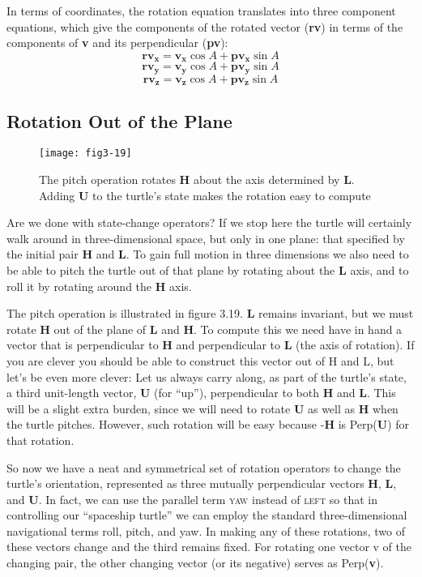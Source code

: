 \documentclass{book}
\begin{document}
In terms of coordinates, the rotation equation translates into three
component equations, which give the components of the rotated vector
(\textbf{rv}) in terms of the components of \textbf{v} and its perpendicular (\textbf{pv}):
$$\mathbf{rv_x} = \mathbf{v_x} \cos A + \mathbf{pv_x} \sin A$$
$$\mathbf{rv_y} = \mathbf{v_y} \cos A + \mathbf{pv_y} \sin A$$
$$\mathbf{rv_z} = \mathbf{v_z} \cos A + \mathbf{pv_z} \sin A$$

\subsection{Rotation Out of the Plane}

\begin{figure}
\begin{center}
\texttt{[image: fig3-19]}
\caption{The pitch operation rotates \textbf{H} about the axis determined by \textbf{L}. Adding \textbf{U} to the turtle's state makes the rotation easy to compute}
\end{center}
\end{figure}

Are we done with state-change operators? If we stop here the turtle will
certainly walk around in three-dimensional space, but only in one plane:
that specified by the initial pair \textbf{H} and \textbf{L}. To gain full motion in three
dimensions we also need to be able to pitch the turtle out of that plane
by rotating about the \textbf{L} axis, and to roll it by rotating around the \textbf{H}
axis.

The pitch operation is illustrated in figure 3.19. \textbf{L} remains invariant,
but we must rotate \textbf{H} out of the plane of \textbf{L} and \textbf{H}. To compute this we
need have in hand a vector that is perpendicular to \textbf{H} and perpendicular
to \textbf{L} (the axis of rotation). If you are clever you should be able to
construct this vector out of H and L, but let's be even more clever: Let
us always carry along, as part of the turtle's state, a third unit-length
vector, \textbf{U} (for ``up''), perpendicular to both \textbf{H} and \textbf{L}. This will be a
slight extra burden, since we will need to rotate \textbf{U} as well as \textbf{H} when
the turtle pitches. However, such rotation will be easy because -\textbf{H} is
Perp(\textbf{U}) for that rotation.

So now we have a neat and symmetrical set of rotation operators to
change the turtle's orientation, represented as three mutually perpendicular vectors \textbf{H}, \textbf{L}, and \textbf{U}. In fact, we can use the parallel term \textsc{yaw}
instead of \textsc{left} so that in controlling our ``spaceship turtle'' we can
employ the standard three-dimensional navigational terms roll, pitch,
and yaw. In making any of these rotations, two of these vectors change
and the third remains fixed. For rotating one vector v of the changing
pair, the other changing vector (or its negative) serves as Perp(\textbf{v}).
\end{document}
